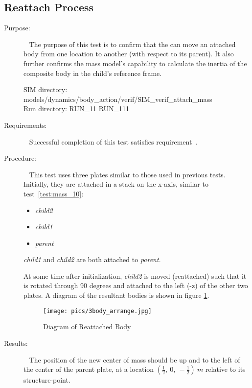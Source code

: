 \subsection{Reattach Process}
\label{test:mass_11}
\begin{description}
\item[Purpose:] \ \newline
The purpose of this test is to confirm that the \ModelDesc
can move an attached body from one location to another (with respect to its
parent).  It also further
confirms the mass model's capability to calculate the inertia of the composite
body in the child's reference frame.

SIM directory: models/dynamics/body\_action/verif/SIM\_verif\_attach\_mass\\
Run directory: RUN\_11 RUN\_111

\item[Requirements:] \ \newline
Successful completion of this test satisfies
requirement~.

\item[Procedure:]\ \newline
This test uses three plates similar to those used in previous tests.
Initially, they are attached in a stack on the x-axis, similar to
test~\ref{test:mass_10}:
\begin{itemize}
 \item \textit{child2}
 \item \textit{child1}
 \item \textit{parent}
\end{itemize}

\textit{child1} and \textit{child2} are both attached to \textit{parent}.

 At some time after initialization, \textit{child2} is moved (reattached) such
 that it is rotated through 90 degrees and attached to the left (-z) of the
 other two plates.  A diagram
of the resultant bodies is shown in figure \ref{3body_arrange}.

\begin{figure}[h]
\begin{center}
\texttt{[image: pics/3body\_arrange.jpg]}
\caption{Diagram of Reattached Body}
\label{3body_arrange}
\end{center}
\end{figure}



\item[Results:]\ \newline
The position of the new center of mass should be up and to the left of the
center of the parent plate, at a location $(\frac{1}{2},~0,~-\frac{1}{2})~m$
relative to its structure-point.


\end{description}
